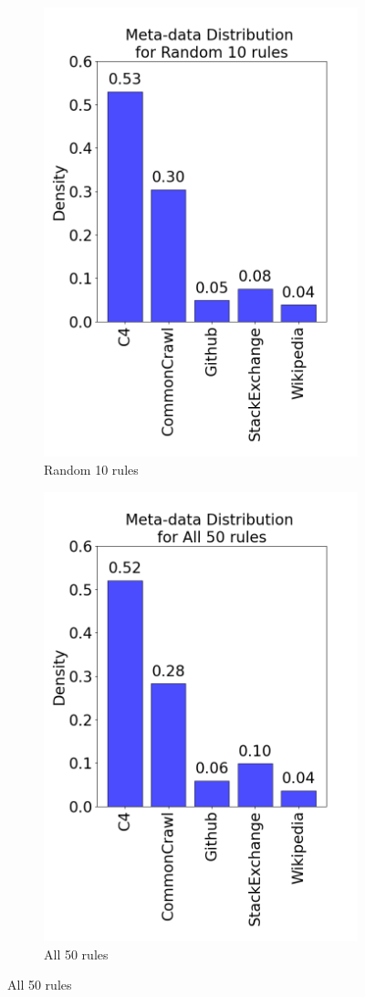 \documentclass{article}
\begin{document}
\begin{figure}[H]
\begin{subfigure}{0.30\textwidth}
    \includegraphics[width=0.8\linewidth]{figures/Code_data_distribution_plots/data_distribution_ft_10rules_randomC.png}
    \caption{Random 10 rules}
\end{subfigure}
\begin{subfigure}{0.30\textwidth}
    \includegraphics[width=0.8\linewidth]{figures/Code_data_distribution_plots/data_distribution_ft_all50rules.png}
    \caption{All 50 rules}
\end{subfigure}


\end{figure}
\end{document}
